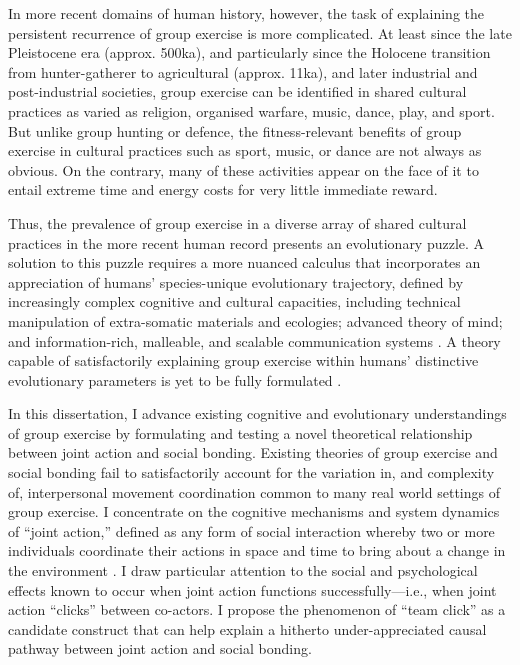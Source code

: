 \begin{CJK}{UTF8}{gbsn}
In more recent domains of human history, however, the task of explaining the persistent recurrence of group exercise is more complicated.  At least since the late Pleistocene era (approx. 500ka), and particularly since the Holocene transition from hunter-gatherer to agricultural (approx. 11ka), and later industrial and post-industrial societies, group exercise can be identified in shared cultural practices as varied as religion, organised warfare, music, dance, play, and sport.  But unlike group hunting or defence, the fitness-relevant benefits of group exercise in cultural practices such as sport, music, or dance are not always as obvious.  On the contrary, many of these activities appear on the face of it to entail extreme time and energy costs for very little immediate reward.

Thus, the prevalence of group exercise in a diverse array of shared cultural practices in the more recent human record presents an evolutionary puzzle.  A solution to this puzzle requires a more nuanced calculus that incorporates an appreciation of humans' species-unique evolutionary trajectory, defined by increasingly complex cognitive and cultural capacities, including technical manipulation of extra-somatic materials and ecologies; advanced theory of mind; and information-rich, malleable, and scalable communication systems \citep{Roepstorff2010,Clark2015,Fuentes2016}.  A theory capable of satisfactorily explaining group exercise within humans' distinctive evolutionary parameters is yet to be fully formulated \citep{Cohen2017}.

In this dissertation, I advance existing cognitive and evolutionary understandings of group exercise by formulating and testing a novel theoretical relationship between joint action and social bonding.  Existing theories of group exercise and social bonding fail to satisfactorily account for the variation in, and complexity of, interpersonal movement coordination common to many real world settings of group exercise.  I concentrate on the cognitive mechanisms and system dynamics of ``joint action,'' defined as any form of social interaction whereby two or more individuals coordinate their actions in space and time to bring about a change in the environment \citep{Sebanz2006}. I draw particular attention to the social and psychological effects known to occur when joint action functions successfully---i.e., when joint action ``clicks'' between co-actors.  I propose the phenomenon of ``team click'' as a candidate construct that can help explain a hitherto under-appreciated causal pathway between joint action and social bonding.


\end{CJK}
